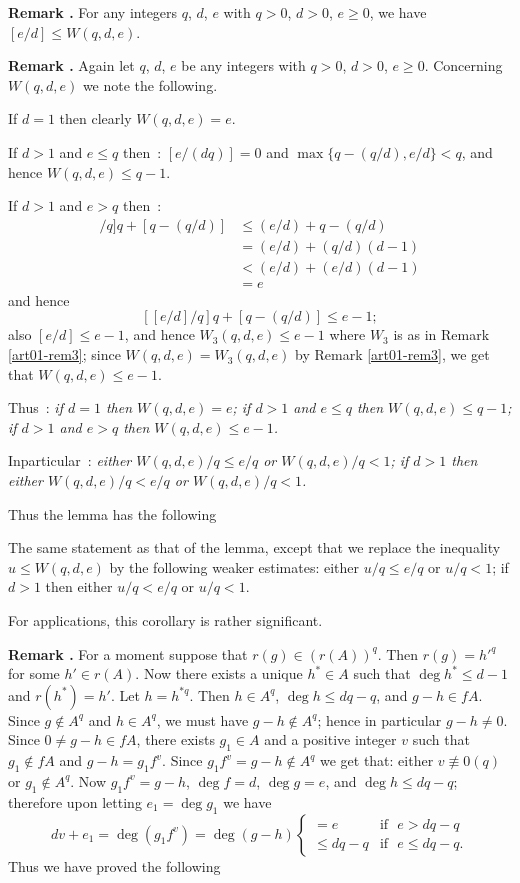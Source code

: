 \smallskip
\noindent
{\bf Remark .\label{art01-rem4}}
For any integers $q$, $d$, $e$ with $q>0$, $d>0$, $e\geq 0$, we have $[e/d]\leq W(q,d,e)$.

\smallskip
\noindent
{\bf Remark .\label{art01-rem5}}
Again let $q$, $d$, $e$ be any integers with $q>0$, $d>0$, $e\geq 0$. Concerning $W(q,d,e)$ we note the following.

If $d=1$ then clearly $W(q,d,e)=e$.

If $d>1$ and $e\leq q$ then~: $[e/(dq)]=0$ and $\max\{q-(q/d),e/d\}<q$, and hence $W(q,d,e)\leq q-1$.

If $d>1$ and $e>q$ then~:
\begin{align*}
[[e/d]/q]q+[q-(q/d)] &\leq (e/d)+q-(q/d)\\
                     &= (e/d)+(q/d)(d-1)\\
                     &< (e/d)+(e/d)(d-1)\\
                     &= e
\end{align*}
and hence
$$
[[e/d]/q]q+[q-(q/d)]\leq e-1;
$$
also $[e/d]\leq e-1$, and hence $W_{3}(q,d,e)\leq e-1$ where $W_{3}$ is as in Remark \ref{art01-rem3}; since $W(q,d,e)=W_{3}(q,d,e)$ by Remark \ref{art01-rem3}, we get that $W(q,d,e)\leq e-1$.

Thus~: {\em if $d=1$ then $W(q,d,e)=e$; if $d>1$ and $e\leq q$ then $W(q,d,e)\leq q-1$; if $d>1$ and $e>q$ then $W(q,d,e)\leq e-1$.}

In\pageoriginale particular~: {\em either $W(q,d,e)/q\leq e/q$ or $W(q,d,e)/q<1$; if $d>1$ then either $W(q,d,e)/q<e/q$ or $W(q,d,e)/q<1$.}
\smallskip

Thus the lemma has the following

\begin{coro*}
The same statement as that of the lemma, except that we replace the inequality $u\leq W(q,d,e)$ by the following weaker estimates: either $u/q\leq e/q$ or $u/q<1$; if $d>1$ then either $u/q<e/q$ or $u/q<1$.
\end{coro*}

For applications, this corollary is rather significant.

\smallskip
\noindent
{\bf Remark .\label{art01-rem6}}
For a moment suppose that $r(g)\in (r(A))^{q}$. Then $r(g)={h'}^{q}$ for some $h'\in r(A)$. Now there exists a unique $h^{*}\in A$ such that $\deg h^{*}\leq d-1$ and $r(h^{*})=h'$. Let $h=h^{*q}$. Then $h\in A^{q}$, $\deg h\leq dq-q$, and $g-h\in fA$. Since $g\not\in A^{q}$ and $h\in A^{q}$, we must have $g-h\not\in A^{q}$; hence in particular $g-h\neq 0$. Since $0\neq g-h\in fA$, there exists $g_{1}\in A$ and a positive integer $v$ such that $g_{1}\not\in fA$ and $g-h=g_{1}f^{v}$. Since $g_{1}f^{v}=g-h\not\in A^{q}$ we get that: either $v\nequiv 0(q)$ or $g_{1}\not\in A^{q}$. Now $g_{1}f^{v}=g-h$, $\deg f=d$, $\deg g=e$, and $\deg h\leq dq-q$; therefore upon letting $e_{1}=\deg g_{1}$ we have
$$
dv+e_{1}=\deg (g_{1}f^{v})=\deg(g-h)
\left\{
\begin{array}{ll}
=e & \text{if~ } e>dq-q\\
\leq dq-q & \text{if~ } e\leq dq-q.
\end{array}\right.
$$
Thus we have proved the following


